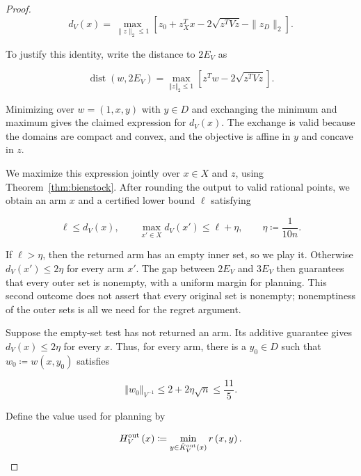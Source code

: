{{\begin{proof}
\begin{equation*}
d_V(x)=\max_{\|z\|_2\le1}
\left[z_0+z_X^T x-2\sqrt{z^T Vz}-\|z_D\|_2\right].
\end{equation*}

To justify this identity, write the distance to $2 E_{V}$ as


\begin{equation*}
\operatorname{dist} \left( w , 2 E_{V} \right) = \operatorname*{max}_{{\left\Vert z \right\Vert}_{2} \le 1} \left[ z^{T} w - 2 \sqrt{z^{T} V z} \right] .
\end{equation*}


Minimizing over $w = \left( 1 , x , y \right)$ with $y \in D$ and exchanging the minimum
and maximum gives the claimed expression for $d_{V} \left( x \right)$. The exchange
is valid because the domains are compact and convex, and the
objective is affine in $y$ and concave in $z$.

We maximize this expression jointly over $x\in X$ and $z$, using
Theorem~\ref{thm:bienstock}. After rounding the output to
valid rational points, we obtain an arm $x$ and a certified lower bound
$\ell$ satisfying

\begin{equation*}
\ell\le d_V(x),\qquad
\max_{x'\in X}d_V(x')\le\ell+\eta,
\qquad \eta\coloneqq\frac{1}{10n}.
\end{equation*}

If $\ell>\eta$, then the returned arm has an empty inner set, so we
play it. Otherwise $d_V(x')\le2\eta$ for every arm $x'$. The gap between
$2E_V$ and $3E_V$ then guarantees that every outer set is nonempty, with
a uniform margin for planning. This second outcome does not assert that
every original set is nonempty; nonemptiness of the outer sets is all
we need for the regret argument.

Suppose the empty-set test has not returned an arm. Its additive
guarantee gives $d_{V} \left( x \right) \le 2 \eta$ for every $x$. Thus, for every arm,
there is a $y_{0} \in D$ such that $w_{0} \coloneqq w \left( x , y_{0} \right)$ satisfies


\begin{equation*}
{\left\Vert w_{0} \right\Vert}_{V^{- 1}} \le 2 + 2 \eta \sqrt{n} \le \frac{11}{5} .
\end{equation*}

Define the value used for planning by


\begin{equation*}
H_{V}^{\text{\normalfont out}} \left( x \right) \coloneqq \operatorname*{min}_{y \in {\hat{K}}_{V}^{\text{\normalfont out}} \left( x \right)} r \left( x , y \right) .
\end{equation*}



\end{proof}}}
